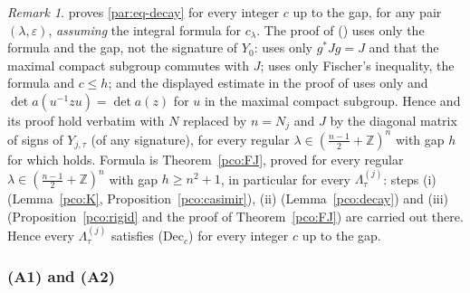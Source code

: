 \documentclass[10pt]{amsart}
\theoremstyle{definition}
\theoremstyle{remark}
\newtheorem{remark}[theorem]{Remark}
\newcommand{\Z}{\mathbb Z}
\begin{document}
\begin{remark}\label{par:FJ}
{\cite[Theorem~5.6]{P51}} proves \eqref{par:eq-decay} for every integer $c$ up to the gap, for any
pair $(\lambda,\varepsilon)$, \emph{assuming} the integral formula {\cite[(59)]{P51}} for $c_\lambda$.
The proof of {\cite[Theorem~5.6]{P51}} ({\cite[Lemmas~5.4 and~5.5]{P51}}) uses only
the formula and the gap, not the signature of $Y_0$: {\cite[Lemma~5.4]{P51}} uses only $g^*Jg=J$ and that the maximal compact subgroup commutes with $J$; {\cite[Lemma~5.5]{P51}} uses only Fischer's inequality, the formula and $c\le h$; and the displayed estimate in the proof of {\cite[Theorem~5.6]{P51}} uses only {\cite[(59)]{P51}} and $\det a(u^{-1}zu)=\det a(z)$ for $u$ in the maximal compact subgroup. Hence {\cite[Theorem~5.6]{P51}} and its proof hold verbatim with $N$ replaced by $n=N_j$ and $J$ by the diagonal matrix of signs of $Y_{j,\tau}$ (of any signature), for every regular $\lambda\in(\frac{n-1}2+\Z)^n$ with gap $h$ for which {\cite[(59)]{P51}} holds.
Formula {\cite[(59)]{P51}} is Theorem~\ref{pco:FJ}, proved for every regular $\lambda\in
(\frac{n-1}2+\Z)^n$ with gap $h\ge n^2+1$, in particular for every $\Lambda^{(j)}_\tau$: steps (i)
(Lemma~\ref{pco:K}, Proposition~\ref{pco:casimir}), (ii) (Lemma~\ref{pco:decay}) and (iii)
(Proposition~\ref{pco:rigid} and the proof of Theorem~\ref{pco:FJ}) are carried out there. Hence every
$\Lambda^{(j)}_\tau$ satisfies (Dec$_c$) for every integer $c$ up to the gap.
\end{remark}

\subsubsection{(A1) and (A2)}\label{par:ss-A12}
\end{document}
